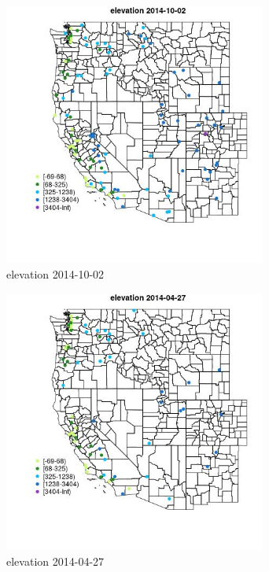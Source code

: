 \begin{figure} 
\centering  
\includegraphics[width=0.77\textwidth]{Code_Outputs/Report_ML_input_PM25_Step4_part_e_de_duplicated_aveswNAs_MapObselevation2014-10-02.jpg} 
\caption{\label{fig:Report_ML_input_PM25_Step4_part_e_de_duplicated_aveswNAsMapObselevation2014-10-02}elevation 2014-10-02} 
\end{figure} 
 

\begin{figure} 
\centering  
\includegraphics[width=0.77\textwidth]{Code_Outputs/Report_ML_input_PM25_Step4_part_e_de_duplicated_aveswNAs_MapObselevation2014-04-27.jpg} 
\caption{\label{fig:Report_ML_input_PM25_Step4_part_e_de_duplicated_aveswNAsMapObselevation2014-04-27}elevation 2014-04-27} 
\end{figure} 
 
